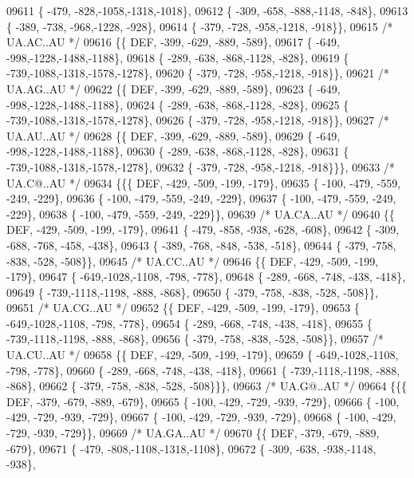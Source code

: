 \begin{DoxyCode}
09611 \{ -479, -828,-1058,-1318,-1018\},
09612 \{ -309, -658, -888,-1148, -848\},
09613 \{ -389, -738, -968,-1228, -928\},
09614 \{ -379, -728, -958,-1218, -918\}\},
09615 \textcolor{comment}{/* UA.AC..AU */}
09616 \{\{  DEF, -399, -629, -889, -589\},
09617 \{ -649, -998,-1228,-1488,-1188\},
09618 \{ -289, -638, -868,-1128, -828\},
09619 \{ -739,-1088,-1318,-1578,-1278\},
09620 \{ -379, -728, -958,-1218, -918\}\},
09621 \textcolor{comment}{/* UA.AG..AU */}
09622 \{\{  DEF, -399, -629, -889, -589\},
09623 \{ -649, -998,-1228,-1488,-1188\},
09624 \{ -289, -638, -868,-1128, -828\},
09625 \{ -739,-1088,-1318,-1578,-1278\},
09626 \{ -379, -728, -958,-1218, -918\}\},
09627 \textcolor{comment}{/* UA.AU..AU */}
09628 \{\{  DEF, -399, -629, -889, -589\},
09629 \{ -649, -998,-1228,-1488,-1188\},
09630 \{ -289, -638, -868,-1128, -828\},
09631 \{ -739,-1088,-1318,-1578,-1278\},
09632 \{ -379, -728, -958,-1218, -918\}\}\},
09633 \textcolor{comment}{/* UA.C@..AU */}
09634 \{\{\{  DEF, -429, -509, -199, -179\},
09635 \{ -100, -479, -559, -249, -229\},
09636 \{ -100, -479, -559, -249, -229\},
09637 \{ -100, -479, -559, -249, -229\},
09638 \{ -100, -479, -559, -249, -229\}\},
09639 \textcolor{comment}{/* UA.CA..AU */}
09640 \{\{  DEF, -429, -509, -199, -179\},
09641 \{ -479, -858, -938, -628, -608\},
09642 \{ -309, -688, -768, -458, -438\},
09643 \{ -389, -768, -848, -538, -518\},
09644 \{ -379, -758, -838, -528, -508\}\},
09645 \textcolor{comment}{/* UA.CC..AU */}
09646 \{\{  DEF, -429, -509, -199, -179\},
09647 \{ -649,-1028,-1108, -798, -778\},
09648 \{ -289, -668, -748, -438, -418\},
09649 \{ -739,-1118,-1198, -888, -868\},
09650 \{ -379, -758, -838, -528, -508\}\},
09651 \textcolor{comment}{/* UA.CG..AU */}
09652 \{\{  DEF, -429, -509, -199, -179\},
09653 \{ -649,-1028,-1108, -798, -778\},
09654 \{ -289, -668, -748, -438, -418\},
09655 \{ -739,-1118,-1198, -888, -868\},
09656 \{ -379, -758, -838, -528, -508\}\},
09657 \textcolor{comment}{/* UA.CU..AU */}
09658 \{\{  DEF, -429, -509, -199, -179\},
09659 \{ -649,-1028,-1108, -798, -778\},
09660 \{ -289, -668, -748, -438, -418\},
09661 \{ -739,-1118,-1198, -888, -868\},
09662 \{ -379, -758, -838, -528, -508\}\}\},
09663 \textcolor{comment}{/* UA.G@..AU */}
09664 \{\{\{  DEF, -379, -679, -889, -679\},
09665 \{ -100, -429, -729, -939, -729\},
09666 \{ -100, -429, -729, -939, -729\},
09667 \{ -100, -429, -729, -939, -729\},
09668 \{ -100, -429, -729, -939, -729\}\},
09669 \textcolor{comment}{/* UA.GA..AU */}
09670 \{\{  DEF, -379, -679, -889, -679\},
09671 \{ -479, -808,-1108,-1318,-1108\},
09672 \{ -309, -638, -938,-1148, -938\},

\end{DoxyCode}
